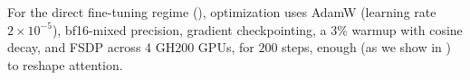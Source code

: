For the direct fine-tuning regime (), optimization uses AdamW (learning rate $2{\times}10^{-5}$), bf16-mixed precision, gradient checkpointing, a 3\% warmup with cosine decay, and FSDP across 4 GH200 GPUs, for $200$ steps, enough (as we show in ) to reshape attention.
